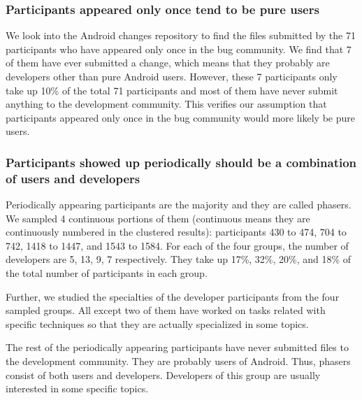 \documentclass[10pt, conference, compsocconf]{IEEEtran}
\begin{document}
\subsubsection{Participants appeared only once tend to be pure users}
We look into the Android changes repository to find the files
submitted by the 71 participants who have appeared only once in the
bug community. We find that 7 of them have ever submitted a change,
which means that they probably are developers other than pure Android
users. However, these 7 participants only take up 10\% of the total 71
participants and most of them have never submit anything to the
development community. This verifies our assumption that participants
appeared only once in the bug community would more likely be pure
users.


\subsubsection{Participants showed up periodically should be a combination of users and developers}
Periodically appearing participants are the majority and they are
called phasers. We sampled 4 continuous portions of them (continuous
means they are continuously numbered in the clustered results):
participants 430 to 474, 704 to 742, 1418 to 1447, and 1543 to
1584. For each of the four groups, the number of developers are 5, 13,
9, 7 respectively. They take up 17\%, 32\%, 20\%, and 18\% of the
total number of participants in each group. 


Further, we studied the specialties of the developer participants from
the four sampled groups. All except two of them have worked on tasks
related with specific techniques so that they are actually specialized
in some topics. 


The rest of the periodically appearing participants have never
submitted files to the development community. They are probably users
of Android. Thus, phasers consist of both users and
developers. Developers of this group are usually interested in some
specific topics.
\end{document}
